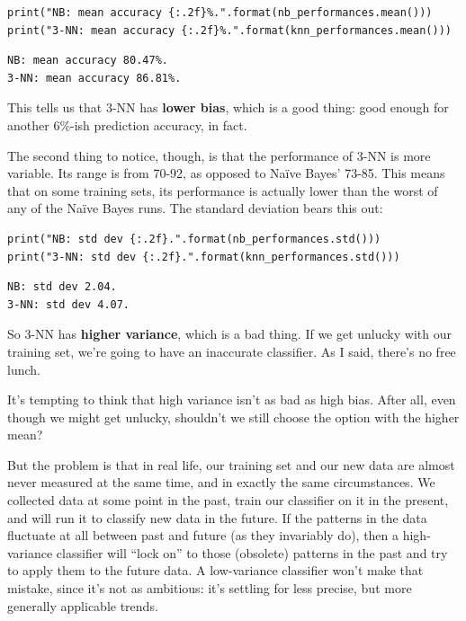 \begin{Verbatim}[fontsize=\scriptsize,samepage=true,frame=single,framesep=3mm]
print("NB: mean accuracy {:.2f}%.".format(nb_performances.mean()))
print("3-NN: mean accuracy {:.2f}%.".format(knn_performances.mean()))
\end{Verbatim}
\vspace{-.2in}

\begin{Verbatim}[fontsize=\small,samepage=true,frame=leftline,framesep=5mm,framerule=1mm]
NB: mean accuracy 80.47%.
3-NN: mean accuracy 86.81%.
\end{Verbatim}

This tells us that 3-NN has \textbf{lower bias}, which is a good thing: good
enough for another 6\%-ish prediction accuracy, in fact.

The second thing to notice, though, is that the performance of 3-NN is more
variable. Its range is from 70-92, as opposed to Na\"{i}ve Bayes' 73-85. This
means that on some training sets, its performance is actually lower than the
worst of any of the Na\"{i}ve Bayes runs. The standard deviation bears this
out:

\begin{Verbatim}[fontsize=\footnotesize,samepage=true,frame=single,framesep=3mm]
print("NB: std dev {:.2f}.".format(nb_performances.std()))
print("3-NN: std dev {:.2f}.".format(knn_performances.std()))
\end{Verbatim}
\vspace{-.2in}

\begin{Verbatim}[fontsize=\small,samepage=true,frame=leftline,framesep=5mm,framerule=1mm]
NB: std dev 2.04.
3-NN: std dev 4.07.
\end{Verbatim}


So 3-NN has \textbf{higher variance}, which is a bad thing. If we get unlucky
with our training set, we're going to have an inaccurate classifier. As I said,
there's no free lunch.

\bigskip

It's tempting to think that high variance isn't as bad as high bias. After all,
even though we might get unlucky, shouldn't we still choose the option with the
higher mean?

But the problem is that in real life, our training set and our new data are
almost never measured at the same time, and in exactly the same circumstances.
We collected data at some point in the past, train our classifier on it in the
present, and will run it to classify new data in the future. If the patterns in
the data fluctuate at all between past and future (as they invariably do), then
a high-variance classifier will ``lock on'' to those (obsolete) patterns in the
past and try to apply them to the future data. A low-variance classifier won't
make that mistake, since it's not as ambitious: it's settling for less precise,
but more generally applicable trends.


